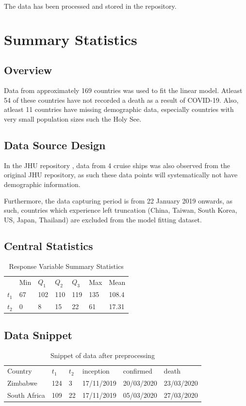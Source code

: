 \documentclass[]{report}
\begin{document}
The data has been processed and stored in the repository.


\section{Summary Statistics}

\subsection*{Overview}

Data from approximately 169 countries was used to fit the linear model. Atleast 54 of these countries have not recorded a death as a result of COVID-19. Also, atleast 11 countries have missing demographic data, especially countries with very small population sizes such the Holy See. 

\subsection*{Data Source Design}

In the JHU repository \cite{jhu}, data from 4 cruise ships was also observed from the original JHU repository, as such these data points will systematically not have demographic information. 

Furthermore, the data capturing period is from 22 January 2019 onwards, as such, countries which experience left truncation (China, Taiwan, South Korea, US, Japan, Thailand) are excluded from the model fitting dataset.

\newpage

\subsection*{Central Statistics}

\begin{table}[htb]
	\centering
	\caption{Response Variable Summary Statistics}
	\begin{tabular}{lllllll}
		& Min & $Q_1$ & $Q_2$ & $Q_3$ & Max & Mean  \\
		$t_1$ & 67  & 102   & 110   & 119   & 135 & 108.4 \\
		$t_2$ & 0   & 8     & 15    & 22    & 61  & 17.31
	\end{tabular}
\end{table}

\subsection*{Data Snippet}
\begin{table}[htb]
	\centering
	\caption{Snippet of data after preprocessing \cite{covidsa}}
	\label{snippet1}
	\begin{tabular}{llllll}
		Country      & $t_1$  & $t_2$ & inception  & confirmed  & death      \\
		Zimbabwe     & 124 & 3  & 17/11/2019 & 20/03/2020 & 23/03/2020 \\
		South Africa & 109 & 22 & 17/11/2019 & 05/03/2020 & 27/03/2020
	\end{tabular}
\end{table}
\end{document}

